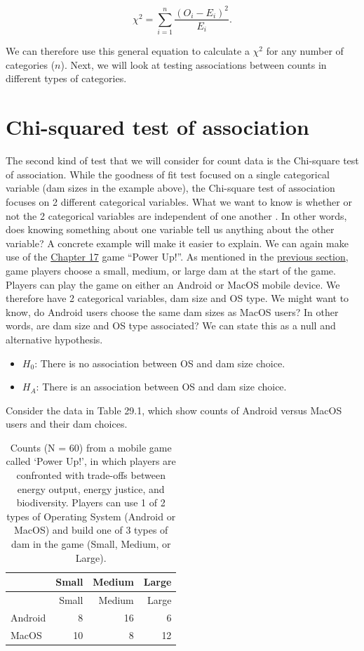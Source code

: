\documentclass[
]{scrbook}
\providecommand{\tightlist}{%
  \setlength{\itemsep}{0pt}\setlength{\parskip}{0pt}}
\begin{document}
\[\chi^{2} = \sum_{i = 1}^{n} \frac{\left(O_{i} - E_{i}\right)^{2}}{E_{i}}.\]

We can therefore use this general equation to calculate a \(\chi^{2}\) for any number of categories (\(n\)).
Next, we will look at testing associations between counts in different types of categories.

\hypertarget{chi-squared-test-of-association}{%
\section{Chi-squared test of association}\label{chi-squared-test-of-association}}

The second kind of test that we will consider for count data is the Chi-square test of association.
While the goodness of fit test focused on a single categorical variable (dam sizes in the example above), the Chi-square test of association focuses on 2 different categorical variables.
What we want to know is whether or not the 2 categorical variables are independent of one another \citep{Box1978}.
In other words, does knowing something about one variable tell us anything about the other variable?
A concrete example will make it easier to explain.
We can again make use of the \protect\hyperlink{Chapter_17}{Chapter 17} game ``Power Up!''.
As mentioned in the \protect\hyperlink{chi-squared-goodness-of-fit}{previous section}, game players choose a small, medium, or large dam at the start of the game.
Players can play the game on either an Android or MacOS mobile device.
We therefore have 2 categorical variables, dam size and OS type.
We might want to know, do Android users choose the same dam sizes as MacOS users?
In other words, are dam size and OS type associated?
We can state this as a null and alternative hypothesis.

\begin{itemize}
\tightlist
\item
  \(H_{0}\): There is no association between OS and dam size choice.
\item
  \(H_{A}\): There is an association between OS and dam size choice.
\end{itemize}

Consider the data in Table 29.1, which show counts of Android versus MacOS users and their dam choices.

\begin{longtable}[]{@{}lrrr@{}}
\caption{\label{tab:unnamed-chunk-140}Counts (N = 60) from a mobile game called `Power Up!', in which players are confronted with trade-offs between energy output, energy justice, and biodiversity. Players can use 1 of 2 types of Operating System (Android or MacOS) and build one of 3 types of dam in the game (Small, Medium, or Large).}\tabularnewline
\toprule
& Small & Medium & Large \\
\midrule
\endfirsthead
\toprule
& Small & Medium & Large \\
\midrule
\endhead
Android & 8 & 16 & 6 \\
MacOS & 10 & 8 & 12 \\
\bottomrule
\end{longtable}
\end{document}
